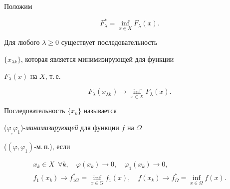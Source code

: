 Положим


$$




F^{*}_{\lambda} = \inf\limits_{x\in X}F_{\lambda}(x).






$$


Для любого $\lambda\geq 0$ существует последовательность


$\{x_{\lambda k}\}$, которая является минимизирующей для функции


$F_{\lambda}(x)$ на $X$, т.\,е.


$$




F_{\lambda}(x_{\lambda k})\longrightarrow\inf\limits_{x\in


X}F_{\lambda}(x).






$$





\begin{defns}


Последовательность $\{x_{k}\}$ называется


($\varphi_,\varphi_1$)-{\it минимизирующей} для функции $f$ на $\Omega$


($(\varphi,\varphi_1)$-м.\,п.), если


\begin{gather*}




x_{k}\in X\ \; \forall k,\quad \varphi(x_k)\to 0,\quad


\varphi_1(x_k)\to 0, \\




f_1(x_{k})\longrightarrow f^{*}_{1G}=\inf_{x\in G}f_1(x),\quad


f(x_{k})\longrightarrow f^{*}_\Omega=\inf_{x\in \Omega}f(x).


\end{gather*}


\end{defns}





